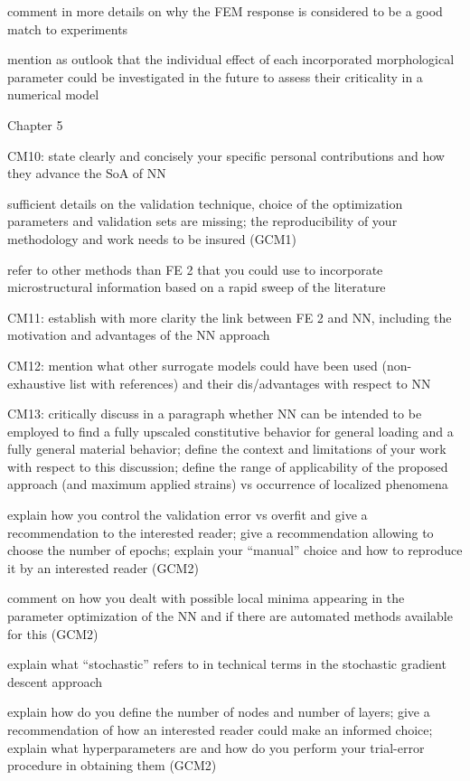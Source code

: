 comment in more details on why the FEM response is considered to be a good
match to experiments

mention as outlook that the individual effect of each incorporated morphological
parameter could be investigated in the future to assess their criticality in a numerical
model

Chapter 5

CM10: state clearly and concisely your specific personal contributions and how they
advance the SoA of NN

sufficient details on the validation technique, choice of the optimization parameters
and validation sets are missing; the reproducibility of your methodology and work
needs to be insured (GCM1)

refer to other methods than FE 2 that you could use to incorporate microstructural
information based on a rapid sweep of the literature

CM11: establish with more clarity the link between FE 2 and NN, including the
motivation and advantages of the NN approach

CM12: mention what other surrogate models could have been used (non-
exhaustive list with references) and their dis/advantages with respect to NN

CM13: critically discuss in a paragraph whether NN can be intended to be
employed to find a fully upscaled constitutive behavior for general loading and a
fully general material behavior; define the context and limitations of your work with
respect to this discussion; define the range of applicability of the proposed
approach (and maximum applied strains) vs occurrence of localized phenomena

explain how you control the validation error vs overfit and give a recommendation to
the interested reader; give a recommendation allowing to choose the number of
epochs; explain your “manual” choice and how to reproduce it by an interested
reader (GCM2)

comment on how you dealt with possible local minima appearing in the parameter
optimization of the NN and if there are automated methods available for this
(GCM2)

explain what “stochastic” refers to in technical terms in the stochastic gradient
descent approach

explain how do you define the number of nodes and number of layers; give a
recommendation of how an interested reader could make an informed choice;
explain what hyperparameters are and how do you perform your trial-error
procedure in obtaining them (GCM2)

